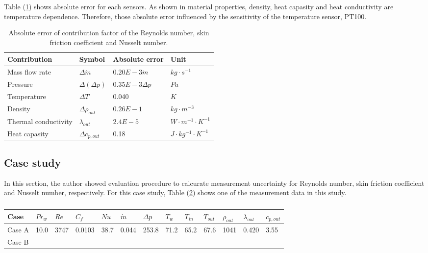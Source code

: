 \documentclass[12pt,oneside]{jbook}
\begin{document}
Table (\ref{absolute_error}) shows absolute error for each sensors.
As shown in material properties, density, heat capasity and heat conductivity are temperature dependence.
Therefore, those absolute error influenced by the sensitivity of the temperature sensor, PT100.
\begin{table}[h]
\centering
\caption{Absolute error of contribution factor of the Reynolds number, skin friction coefficient and Nusselt number.}
\vspace{1zh}
\label{absolute_error}
\begin{tabular}{llll} \toprule%
{Contribution} & {Symbol}          & {Absolute error}   & {Unit}\\ \midrule
Mass flow rate & $\Delta \dot{m}$  & $0.20E-3\dot{m}$   & $kg\cdot s^{-1}$\\
Pressure       & $\Delta(\Delta p)$& $0.35E-3\Delta p$  & $Pa$\\
Temperature    & $\Delta T$        & 0.040              & $K$\\
Density        & $\Delta \rho_{out}$& $0.26E-1$         & $kg\cdot m^{-3}$\\
Thermal conductivity & $\lambda_{out}$& $2.4E-5$        & $W\cdot m^{-1}\cdot K^{-1}$\\
Heat capasity  & $\Delta c_{p,out}$& 0.18               & $J\cdot kg^{-1}\cdot K^{-1}$\\
\bottomrule
\end{tabular}
\end{table}

\clearpage
\subsection{Case study}
In this section, the author showed evaluation procedure to calcurate measurement uncertainty for Reynolds number, skin friction coefficient and Nusselt number, respectively.
For this case study, Table (\ref{case_study}) shows one of the measurement data in this study.

\begin{table}[h]
\centering
\caption{}
\vspace{1zh}
\label{case_study}
\begin{tabular}{lllllllllllll} \toprule%
{Case} & {$Pr_{w}$} & {$Re$}  & {$C_{f}$} & {$Nu$} & {$\dot{m}$} & {$\Delta p$} & {$T_{w}$} & {$T_{in}$} & {$T_{out}$} & {$\rho_{out}$} & {$\lambda_{out}$} & $c_{p,out}$\\ \midrule
Case A & 10.0 & 3747 & 0.0103 & 38.7 & 0.044 & 253.8 & 71.2 & 65.2 & 67.6 & 1041 & 0.420 & 3.55\\
Case B &&&&&&&&&&&&\\
\bottomrule
\end{tabular}
\end{table}
\end{document}
